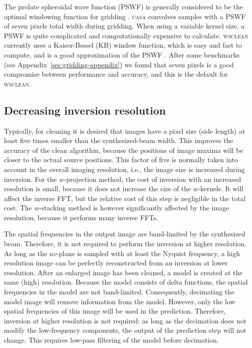 \documentclass[useAMS,usenatbib]{mn2e}
\begin{document}
The prolate spheroidal wave function (PSWF) is generally considered to be the optimal windowing function for gridding \citep{fourier-kernel-selection-1991}. \textsc{casa} convolves samples with a PSWF of seven pixels total width during gridding. When using a variable kernel size, a PSWF is quite complicated and computationally expensive to calculate. \textsc{wsclean} currently uses a Kaiser-Bessel (KB) window function, which is easy and fast to compute, and is a good approximation of the PSWF \citep{fourier-kernel-selection-1991}. After some benchmarks (see Appendix~\ref{sec:gridding-appendix}) we found that seven pixels is a good compromise between performance and accuracy, and this is the default for \textsc{wsclean}.

\subsection{Decreasing inversion resolution} \label{sec:decreasing-inversion-resolution}
Typically, for cleaning it is desired that images have a pixel size (side length) at least five times smaller than the synthesized-beam width. This improves the accuracy of the clean algorithm, because the positions of image maxima will be closer to the actual source positions. This factor of five is normally taken into account in the overall imaging resolution, i.e., the image size is increased during inversion. For the $w$-projection method, the cost of inversion with an increased resolution is small, because it does not increase the size of the $w$-kernels. It will affect the inverse FFT, but the relative cost of this step is negligible in the total cost. The $w$-stacking method is however significantly affected by the image resolution, because it performs many inverse FFTs.

The spatial frequencies in the output image are band-limited by the synthesized beam. Therefore, it is not required to perform the inversion at higher resolution. As long as the $uv$-plane is sampled with at least the Nyquist frequency, a high resolution image can be perfectly reconstructed from an inversion at lower resolution. After an enlarged image has been cleaned, a model is created at the same (high) resolution. Because the model consists of delta functions, the spatial frequencies in the model are not band-limited. Consequently, decimating the model image will remove information from the model. However, only the low spatial frequencies of this image will be used in the prediction. Therefore, inversion at higher resolution is not required: as long as the decimation does not modify the low-frequency components, the output of the prediction step will not change. This requires low-pass filtering of the model before decimation.
\end{document}
